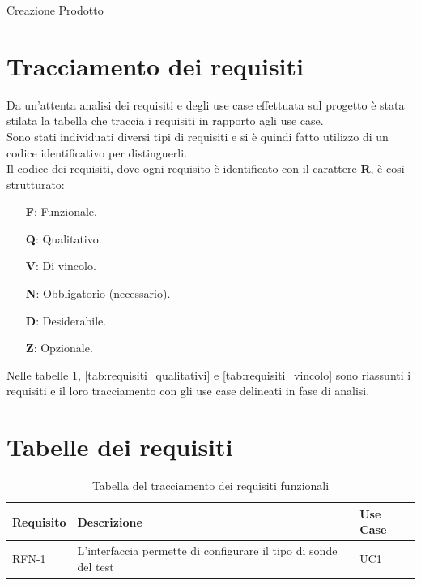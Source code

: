 \begin{usecase}{2}{Creazione Prodotto}
    \label{uc:uc_creazione_prodotto}
\end{usecase}

\section{Tracciamento dei requisiti}
Da un'attenta analisi dei requisiti e degli use case effettuata sul progetto è stata stilata la tabella che traccia i requisiti in rapporto agli use case.\\
Sono stati individuati diversi tipi di requisiti e si è quindi fatto utilizzo di un codice identificativo per distinguerli.\\
Il codice dei requisiti, dove ogni requisito è identificato con il carattere \textbf{R}, è così strutturato:
\begin{enumerate}
    \item[\textbf{F}:] Funzionale.
    \item[\textbf{Q}:] Qualitativo.
    \item[\textbf{V}:] Di vincolo.
    \item[\textbf{N}:] Obbligatorio (necessario).
    \item[\textbf{D}:] Desiderabile.
    \item[\textbf{Z}:] Opzionale.
\end{enumerate}

Nelle tabelle \ref{tab:requisiti_funzionali}, \ref{tab:requisiti_qualitativi} e \ref{tab:requisiti_vincolo} sono riassunti i requisiti e il loro tracciamento con gli use case delineati in fase di analisi.

\section{Tabelle dei requisiti}
\begin{table}[h]
    \begin{tabularx}{\textwidth}{lXl}
        \hline
        \textbf{Requisito} & \textbf{Descrizione} & \textbf{Use Case} \\
        \hline
        RFN-1 & L'interfaccia permette di configurare il tipo di sonde del test & UC1 \\
        \hline
    \end{tabularx}    
    \caption{Tabella del tracciamento dei requisiti funzionali}
    \label{tab:requisiti_funzionali}
\end{table}

